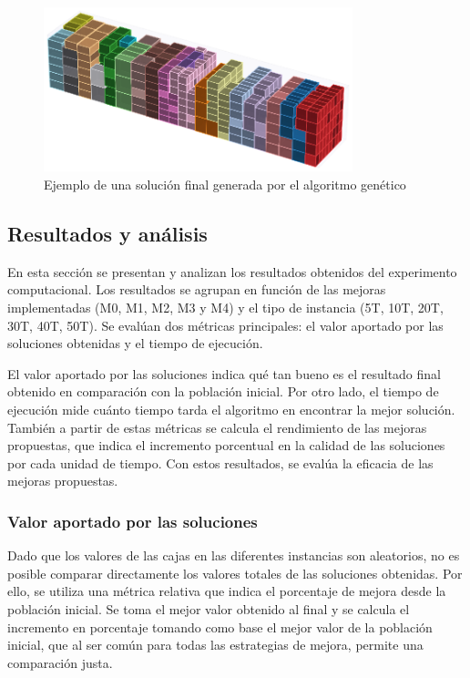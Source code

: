 \documentclass[openany]{article}
\begin{document}
\begin{figure}[H]
    \centering
    \includegraphics[width=0.8\textwidth]{Figures/ejemplo_solucion.eps}
    \caption{Ejemplo de una solución final generada por el algoritmo genético}
    \label{fig:ejemplo_solucion}
\end{figure}

\subsection{Resultados y análisis}

En esta sección se presentan y analizan los resultados obtenidos del experimento computacional. Los resultados se agrupan en función de las mejoras implementadas (M0, M1, M2, M3 y M4) y el tipo de instancia (5T, 10T, 20T, 30T, 40T, 50T). Se evalúan dos métricas principales: el valor aportado por las soluciones obtenidas y el tiempo de ejecución.

El valor aportado por las soluciones indica qué tan bueno es el resultado final obtenido en comparación con la población inicial. Por otro lado, el tiempo de ejecución mide cuánto tiempo tarda el algoritmo en encontrar la mejor solución. También a partir de estas métricas se calcula el rendimiento de las mejoras propuestas, que indica el incremento porcentual en la calidad de las soluciones por cada unidad de tiempo. Con estos resultados, se evalúa la eficacia de las mejoras propuestas.

\subsubsection{Valor aportado por las soluciones}

Dado que los valores de las cajas en las diferentes instancias son aleatorios, no es posible comparar directamente los valores totales de las soluciones obtenidas. Por ello, se utiliza una métrica relativa que indica el porcentaje de mejora desde la población inicial. Se toma el mejor valor obtenido al final y se calcula el incremento en porcentaje tomando como base el mejor valor de la población inicial, que al ser común para todas las estrategias de mejora, permite una comparación justa.
\end{document}
